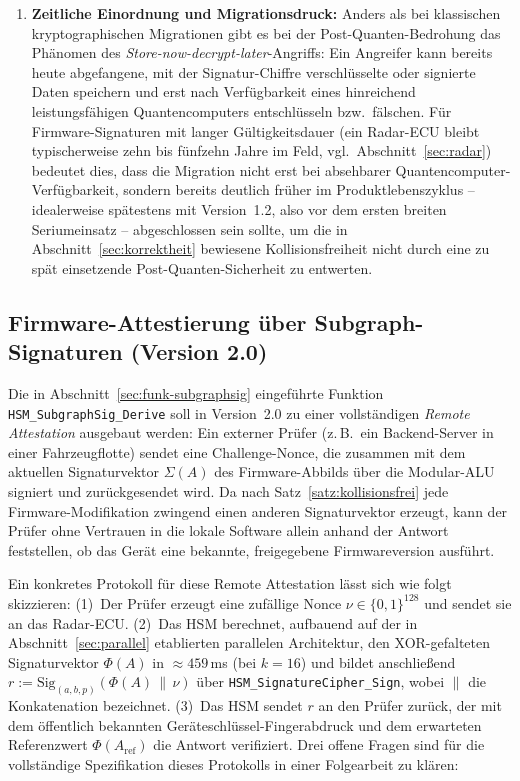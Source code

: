 ﻿\documentclass[a4paper,12pt]{article}
\theoremstyle{definition}
\begin{document}
\begin{enumerate}
	\item \textbf{Zeitliche Einordnung und Migrationsdruck:} Anders als bei klassischen kryptographischen Migrationen gibt es bei der Post-Quanten-Bedrohung das Phänomen des \emph{Store-now-decrypt-later}-Angriffs: Ein Angreifer kann bereits heute abgefangene, mit der Signatur-Chiffre verschlüsselte oder signierte Daten speichern und erst nach Verfügbarkeit eines hinreichend leistungsfähigen Quantencomputers entschlüsseln bzw.\ fälschen. Für Firmware-Signaturen mit langer Gültigkeitsdauer (ein Radar-ECU bleibt typischerweise zehn bis fünfzehn Jahre im Feld, vgl.\ Abschnitt~\ref{sec:radar}) bedeutet dies, dass die Migration nicht erst bei absehbarer Quantencomputer-Verfügbarkeit, sondern bereits deutlich früher im Produktlebenszyklus -- idealerweise spätestens mit Version~1.2, also vor dem ersten breiten Seriumeinsatz -- abgeschlossen sein sollte, um die in Abschnitt~\ref{sec:korrektheit} bewiesene Kollisionsfreiheit nicht durch eine zu spät einsetzende Post-Quanten-Sicherheit zu entwerten.
\end{enumerate}

\subsection{Firmware-Attestierung über Subgraph-Signaturen (Version 2.0)}

Die in Abschnitt~\ref{sec:funk-subgraphsig} eingeführte Funktion \texttt{HSM\_SubgraphSig\_Derive} soll in Version~2.0 zu einer vollständigen \emph{Remote Attestation} ausgebaut werden: Ein externer Prüfer (z.\,B.\ ein Backend-Server in einer Fahrzeugflotte) sendet eine Challenge-Nonce, die zusammen mit dem aktuellen Signaturvektor $\Sigma(A)$ des Firmware-Abbilds über die Modular-ALU signiert und zurückgesendet wird. Da nach Satz~\ref{satz:kollisionsfrei} jede Firmware-Modifikation zwingend einen anderen Signaturvektor erzeugt, kann der Prüfer ohne Vertrauen in die lokale Software allein anhand der Antwort feststellen, ob das Gerät eine bekannte, freigegebene Firmwareversion ausführt.

Ein konkretes Protokoll für diese Remote Attestation lässt sich wie folgt skizzieren: (1)~Der Prüfer erzeugt eine zufällige Nonce $\nu \in \{0,1\}^{128}$ und sendet sie an das Radar-ECU. (2)~Das HSM berechnet, aufbauend auf der in Abschnitt~\ref{sec:parallel} etablierten parallelen Architektur, den XOR-gefalteten Signaturvektor $\Phi(A)$ in $\approx 459$\,ms (bei $k=16$) und bildet anschließend $r := \mathrm{Sig}_{(a,b,p)}(\Phi(A) \,\|\, \nu)$ über \texttt{HSM\_SignatureCipher\_Sign}, wobei $\|$ die Konkatenation bezeichnet. (3)~Das HSM sendet $r$ an den Prüfer zurück, der mit dem öffentlich bekannten Geräteschlüssel-Fingerabdruck und dem erwarteten Referenzwert $\Phi(A_{\mathrm{ref}})$ die Antwort verifiziert. Drei offene Fragen sind für die vollständige Spezifikation dieses Protokolls in einer Folgearbeit zu klären:
\end{document}
